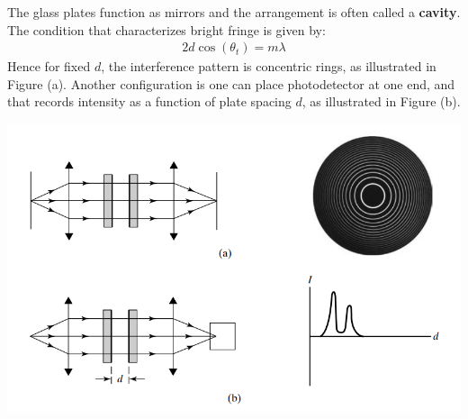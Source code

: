 \documentclass[11pt]{book}
\theoremstyle{break}
\theoremstyle{break}
\begin{document}
The glass plates function as mirrors and the arrangement is often called a \textbf{cavity}. The condition that characterizes bright fringe is given by:
\begin{align*}
2d \cos(\theta_t) = m\lambda
\end{align*}
Hence for fixed $d$, the interference pattern is concentric rings, as illustrated in Figure (a). Another configuration is one can place photodetector at one end, and that records intensity as a function of plate spacing $d$, as illustrated in Figure (b).
\begin{center}
\includegraphics[scale=0.65]{ab}
\end{center}
\end{document}
